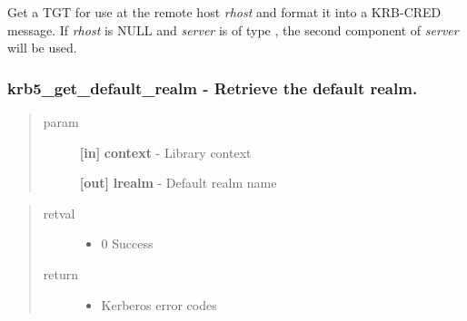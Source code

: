 \documentclass[letterpaper,10pt,english]{sphinxmanual}
\begin{document}
Get a TGT for use at the remote host \emph{rhost} and format it into a KRB-CRED message. If \emph{rhost} is NULL and \emph{server} is of type {\hyperref[appdev/refs/macros/KRB5_NT_SRV_HST:KRB5_NT_SRV_HST]{}} , the second component of \emph{server} will be used.


\subsubsection{krb5\_get\_default\_realm -  Retrieve the default realm.}
\label{appdev/refs/api/krb5_get_default_realm:krb5-get-default-realm-retrieve-the-default-realm}\label{appdev/refs/api/krb5_get_default_realm::doc}

\begin{fulllineitems}
\label{appdev/refs/api/krb5_get_default_realm:c.krb5_get_default_realm}
\end{fulllineitems}

\begin{quote}\begin{description}
\item[{param}] \leavevmode
\textbf{{[}in{]}} \textbf{context} - Library context

\textbf{{[}out{]}} \textbf{lrealm} - Default realm name

\end{description}\end{quote}
\begin{quote}\begin{description}
\item[{retval}] \leavevmode\begin{itemize}
\item {} 
0   Success

\end{itemize}

\item[{return}] \leavevmode\begin{itemize}
\item {} 
Kerberos error codes

\end{itemize}

\end{description}\end{quote}
\end{document}
